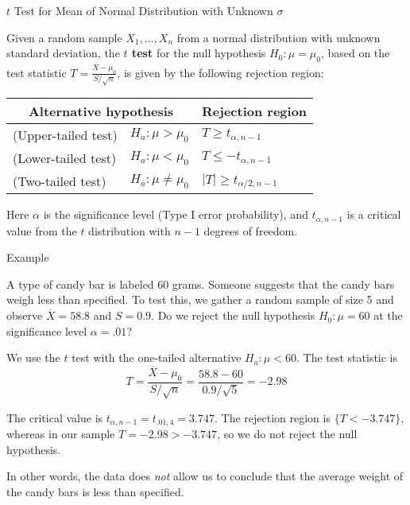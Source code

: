 \documentclass{beamer}
\renewcommand{\emph}{\textbf}
\begin{document}
\begin{frame}{$t$ Test for Mean of Normal Distribution with Unknown $\sigma$ }
\begin{block}{}
Given a random sample $X_1,\dots,X_n$ from a normal distribution with unknown standard deviation, the \emph{$t$ test} for the null hypothesis $H_0: \mu=\mu_0$, based on the test statistic $T=\frac{\overline X-\mu_0}{S/\sqrt{n}}$, is given by the following rejection region:
\begin{center}
\begin{tabular}{ll|l}
\multicolumn{2}{c}{Alternative hypothesis} & Rejection region \\ \hline
(Upper-tailed test) & $H_a: \mu>\mu_0$ & $T\geq t_{\alpha,n-1}$ \\
(Lower-tailed test) & $H_a: \mu<\mu_0$ & $T\leq -t_{\alpha,n-1}$ \\
(Two-tailed test) & $H_a: \mu\neq\mu_0$ & $|T|\geq t_{\alpha/2,n-1}$\\
\end{tabular}
\end{center}
Here $\alpha$ is the significance level (Type I error probability), and $t_{\alpha,n-1}$ is a critical value from the $t$ distribution with $n-1$ degrees of freedom.
\end{block}
\end{frame}

\begin{frame}{Example}
\begin{block}{}
A type of candy bar is labeled 60 grams. Someone suggests that the candy bars weigh less than specified. To test this, we gather a random sample of size 5 and observe $\overline X=58.8$ and $S=0.9$. Do we reject the null hypothesis $H_0: \mu=60$ at the significance level $\alpha=.01$?
\end{block}

\pause We use the $t$ test with the one-tailed alternative $H_a: \mu<60$. The test statistic  is
$$T=\frac{\overline X-\mu_0}{S/\sqrt{n}}=\frac{58.8-60}{0.9/\sqrt{5}}=-2.98$$

\vspace{.2cm} 
\pause The critical value is $t_{\alpha,n-1}=t_{.01,4}=3.747$. The rejection region is $\{T < -3.747\}$, whereas in our sample $T=-2.98>-3.747$, so we do not reject the null hypothesis.

\vspace{.2cm}
\pause In other words, the data does \textit{not} allow us to conclude that the average weight of the candy bars is less than specified.
\end{frame}
\end{document}
